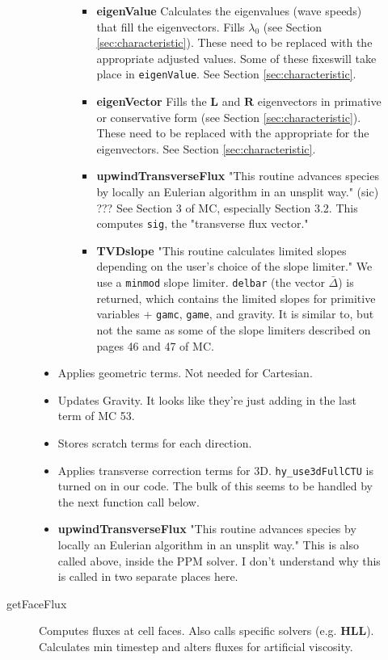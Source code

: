 \documentclass[preprint,11pt]{aastex}
\begin{document}
\begin{description}
\begin{description}
\begin{itemize}
\begin{itemize}
\begin{itemize}
					\item \textbf{eigenValue} Calculates the eigenvalues (wave speeds) that fill the eigenvectors.  Fills $\lambda_0$ (see Section \ref{sec:characteristic}).  {\color{red} These need to be replaced with the appropriate adjusted values.  Some of these fixeswill take place in \verb!eigenValue!.  See Section \ref{sec:characteristic}.}
					\item \textbf{eigenVector} Fills the $\mathbf{L}$ and $\mathbf{R}$ eigenvectors in primative or conservative form (see Section \ref{sec:characteristic}). {\color{red} These need to be replaced with the appropriate for the eigenvectors.  See Section \ref{sec:characteristic}.} 
					\item \textbf{upwindTransverseFlux} "This routine advances species by locally an Eulerian algorithm in an unsplit way." (sic)  ???  See Section 3 of MC, especially Section 3.2.  This computes \verb!sig!, the "transverse flux vector."
					\item \textbf{TVDslope} "This routine calculates limited slopes depending on the user's choice of the slope limiter."  We use a \verb!minmod! slope limiter.  \verb!delbar! (the vector $\bar{\Delta}$) is returned, which contains the limited slopes for primitive variables + \verb!gamc!, \verb!game!, and gravity.  It is similar to, but not the same as some of the slope limiters described on pages 46 and 47 of MC.
				\end{itemize}
			\end{itemize}
			\item Applies geometric terms.  Not needed for Cartesian.
			\item Updates Gravity.  It looks like they're just adding in the last term of MC 53.
			\item Stores scratch terms for each direction.
			\item Applies transverse correction terms for 3D.  \verb!hy_use3dFullCTU! is turned on in our code.  The bulk of this seems to be handled by the next function call below.
			\item \textbf{upwindTransverseFlux} "This routine advances species by locally an Eulerian algorithm in an unsplit way."  This is also called above, inside the PPM solver.  I don't understand why this is called in two separate places here.
		\end{itemize}
		\item[getFaceFlux] Computes fluxes at cell faces.  Also calls specific solvers (e.g. \textbf{HLL}).  Calculates min timestep and alters fluxes for artificial viscosity.

\end{description}
\end{description}
\end{document}
